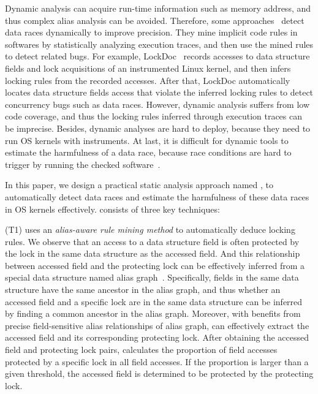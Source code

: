 Dynamic analysis can acquire run-time information such as memory address, and 
thus complex alias analysis can be avoided. Therefore, some 
approaches~\cite{Lochmann:EuroSys19, Lu:SOSP07, Lu:FSE18, Joshi:ASE08, 
Liu:NSDI07} detect data races dynamically to improve precision. They mine 
implicit code rules in softwares by statistically analyzing execution traces, 
and then use the mined rules to detect related bugs. For example, 
LockDoc~\cite{Lochmann:EuroSys19} records accesses to data structure fields and 
lock acquisitions of an instrumented Linux kernel, and then infers locking 
rules from the recorded accesses. After that, LockDoc automatically locates 
data structure fields access that violate the inferred locking rules to detect 
concurrency bugs such as data races. However, dynamic analysis suffers from low 
code coverage, and thus the locking rules inferred through execution traces can 
be imprecise. Besides, dynamic analyses are hard to deploy, because they need 
to run OS kernels with instruments. At last, it is difficult for dynamic 
tools to estimate the harmfulness of a data race, because race conditions are 
hard to trigger by running the checked software~\cite{Fonseca:DSN10, 
Burckhardt:ASPLOS10, Liu:FSE14, Zhou:EASE15}.

In this paper, we design a practical static analysis approach named \sys, 
to automatically detect data races and estimate the harmfulness of these data 
races in OS kernels effectively. \sys consists of three key techniques:

(T1) \sys uses an {\em alias-aware rule mining method} to automatically 
deduce locking rules. We observe that an access to a data structure field is 
often protected by the lock in the same data structure as the accessed field. 
And this relationship between accessed field and the protecting lock can be 
effectively inferred from a special data structure named alias 
graph~\cite{Li:ASPLOS22, Kastrinis:CC18}. Specifically, fields in the same data 
structure have the same ancestor in the alias graph, and thus whether an 
accessed field and a specific lock are in the same data structure can be 
inferred by finding a common ancestor in the alias graph. Moreover, with 
benefits from precise field-sensitive alias relationships of alias graph, 
\sys can effectively extract the accessed field and its corresponding 
protecting lock. After obtaining the accessed field and protecting lock pairs, 
\sys calculates the proportion of field accesses protected by a specific 
lock in all field accesses. If the proportion is larger than a given threshold, 
the accessed field is determined to be protected by the protecting lock.

